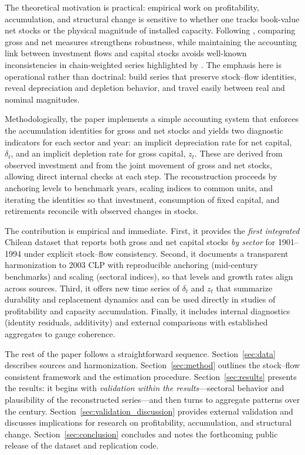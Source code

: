 \documentclass[11pt,a4paper]{article}
\begin{document}
The theoretical motivation is practical: empirical work on profitability, accumulation, and structural change is sensitive to whether one tracks book-value net stocks or the physical magnitude of installed capacity. Following \citet{BasuRama2013}, comparing gross and net measures strengthens robustness, while maintaining the accounting link between investment flows and capital stocks avoids well-known inconsistencies in chain-weighted series highlighted by \citet{Shaikh2016}. The emphasis here is operational rather than doctrinal: build series that preserve stock–flow identities, reveal depreciation and depletion behavior, and travel easily between real and nominal magnitudes.

Methodologically, the paper implements a simple accounting system that enforces the accumulation identities for gross and net stocks and yields two diagnostic indicators for each sector and year: an implicit depreciation rate for net capital, $\delta_t$, and an implicit depletion rate for gross capital, $z_t$. These are derived from observed investment and from the joint movement of gross and net stocks, allowing direct internal checks at each step. The reconstruction proceeds by anchoring levels to benchmark years, scaling indices to common units, and iterating the identities so that investment, consumption of fixed capital, and retirements reconcile with observed changes in stocks.

The contribution is empirical and immediate. First, it provides the \emph{first integrated} Chilean dataset that reports both gross and net capital stocks \emph{by sector} for 1901–1994 under explicit stock–flow consistency. Second, it documents a transparent harmonization to 2003 CLP with reproducible anchoring (mid-century benchmarks) and scaling (sectoral indices), so that levels and growth rates align across sources. Third, it offers new time series of $\delta_t$ and $z_t$ that summarize durability and replacement dynamics and can be used directly in studies of profitability and capacity accumulation. Finally, it includes internal diagnostics (identity residuals, additivity) and external comparisons with established aggregates to gauge coherence.

The rest of the paper follows a straightforward sequence. Section~\ref{sec:data} describes sources and harmonization. Section~\ref{sec:method} outlines the stock–flow consistent framework and the estimation procedure. Section~\ref{sec:results} presents the results: it begins with \emph{validation within the results}—sectoral behavior and plausibility of the reconstructed series—and then turns to aggregate patterns over the century. Section~\ref{sec:validation_discussion} provides external validation and discusses implications for research on profitability, accumulation, and structural change. Section~\ref{sec:conclusion} concludes and notes the forthcoming public release of the dataset and replication code.
\end{document}
